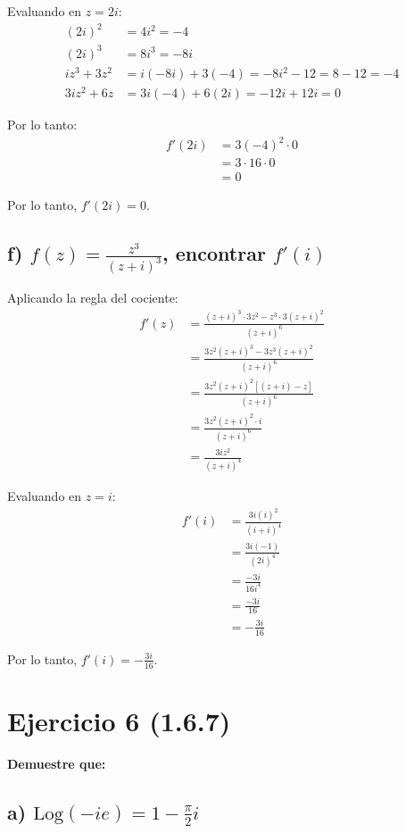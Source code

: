\documentclass{article}
\begin{document}
Evaluando en $z = 2i$:
\begin{align*}
(2i)^2 &= 4i^2 = -4 \\
(2i)^3 &= 8i^3 = -8i \\
iz^3 + 3z^2 &= i(-8i) + 3(-4) = -8i^2 - 12 = 8 - 12 = -4 \\
3iz^2 + 6z &= 3i(-4) + 6(2i) = -12i + 12i = 0
\end{align*}

Por lo tanto:
\begin{align*}
f'(2i) &= 3(-4)^2 \cdot 0 \\
       &= 3 \cdot 16 \cdot 0 \\
       &= 0
\end{align*}

Por lo tanto, $f'(2i) = 0$.

\subsection*{f) $f(z) = \frac{z^3}{(z + i)^3}$, encontrar $f'(i)$}

Aplicando la regla del cociente:
\begin{align*}
f'(z) &= \frac{(z + i)^3 \cdot 3z^2 - z^3 \cdot 3(z + i)^2}{(z + i)^6} \\
      &= \frac{3z^2(z + i)^3 - 3z^3(z + i)^2}{(z + i)^6} \\
      &= \frac{3z^2(z + i)^2[(z + i) - z]}{(z + i)^6} \\
      &= \frac{3z^2(z + i)^2 \cdot i}{(z + i)^6} \\
      &= \frac{3iz^2}{(z + i)^4}
\end{align*}

Evaluando en $z = i$:
\begin{align*}
f'(i) &= \frac{3i(i)^2}{(i + i)^4} \\
      &= \frac{3i(-1)}{(2i)^4} \\
      &= \frac{-3i}{16i^4} \\
      &= \frac{-3i}{16} \\
      &= -\frac{3i}{16}
\end{align*}

Por lo tanto, $f'(i) = -\frac{3i}{16}$.

\newpage
\section*{Ejercicio 6 (1.6.7)}

\textbf{Demuestre que:}

\subsection*{a) $\text{Log}(-ie) = 1 - \frac{\pi}{2}i$}
\end{document}
